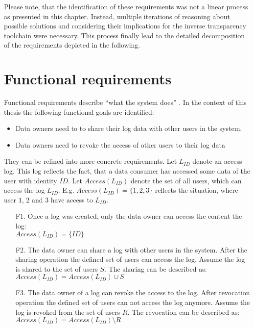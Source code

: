 \documentclass[../main.tex]{subfiles}
\begin{document}
Please note, that the identification of these requirements was not a linear process as presented in this chapter.
Instead, multiple iterations of reasoning about possible solutions and considering their implications for the inverse transparency toolchain were necessary.
This process finally lead to the detailed decomposition of the requirements depicted in the following.


\newpage
\section{Functional requirements}\label{functional-requriements}
Functional requirements describe \enquote{what the system does} \cite[11]{Mylopoulos1992}.
In the context of this thesis the following functional goals are identified:
\begin{itemize}
    \item Data owners need to to share their log data with other users in the system.
    \item Data owners need to revoke the access of other users to their log data
\end{itemize}

They can be refined into more concrete requirements. 
Let $L_{ID}$ denote an access log. 
This log reflects the fact, that a data consumer has accessed some data of the user with identity $ID$.
Let $Access(L_{ID})$ denote the set of all users, which can access the log $L_{ID}$.
E.g. $Access(L_{ID}) =\{1,2,3\}$ reflects the situation, where user $1$, $2$ and $3$ have access to $L_{ID}$.
\begin{enumerate}
    \item [F1.] Once a log was created, only the data owner can access the content the log:
    \\$Access(L_{ID}) =\{ID\}$
    \item [F2.] The data owner can share a log with other users in the system. 
    After the sharing operation the defined set of users can access the log.
    Assume the log is shared to the set of users $S$. 
    The sharing can be described as: 
    \\$Access(L_{ID}) = Access(L_{ID}) \cup S$
    \item [F3.] The data owner of a log can revoke the access to the log.
    After revocation operation the defined set of users can not access the log anymore.
    Assume the log is revoked from the set of users $R$. 
    The revocation can be described as: 
    \\$Access(L_{ID}) = Access(L_{ID}) \setminus R$

\end{enumerate}
\end{document}

